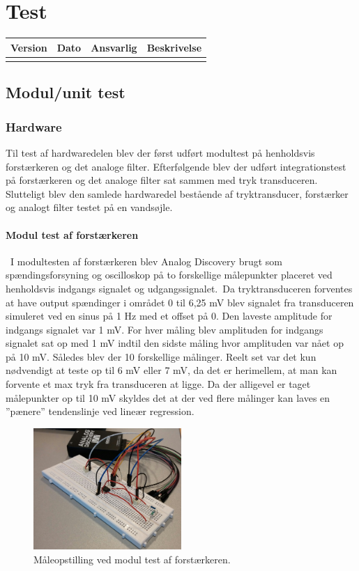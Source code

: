 \chapter{Test}\label{Test}
\setcounter{secnumdepth}{5}

\begin{longtabu} to 
    Version &    Dato &    Ansvarlig &    Beskrivelse\\[-1ex]
    \midrule
\label{version_Systemark}
\end{longtabu}

\section{Modul/unit test}
\subsection{Hardware}
Til test af hardwaredelen blev der først udført modultest på henholdsvis forstærkeren og det analoge filter. Efterfølgende blev der udført integrationstest på forstærkeren og det analoge filter sat sammen med tryk transduceren. Slutteligt blev den samlede hardwaredel bestående af tryktransducer, forstærker og analogt filter testet på en vandsøjle.\
\subsubsection{Modul test af forstærkeren}\
I modultesten af forstærkeren blev Analog Discovery brugt som spændingsforsyning og oscilloskop på to forskellige målepunkter placeret ved henholdsvis indgangs signalet og udgangssignalet.\
Da tryktransduceren forventes at have output spændinger i området 0 til 6,25 mV blev signalet fra transduceren simuleret ved en sinus på 1 Hz med et offset på 0. Den laveste amplitude for indgangs signalet var 1 mV. For hver måling blev amplituden for indgangs signalet sat op med 1 mV indtil den sidste måling hvor amplituden var nået op på 10 mV. Således blev der 10 forskellige målinger. Reelt set var det kun nødvendigt at teste op til 6 mV eller 7 mV, da det er herimellem, at man kan forvente et max tryk fra transduceren at ligge. Da der alligevel er taget målepunkter op til 10 mV skyldes det at der ved flere målinger kan laves en ”pænere” tendenslinje ved lineær regression.\
\begin{figure}[H]
	\centering
	\includegraphics[width=0.5\textwidth]{Figurer/Hardware/ForstaerkerTest}
	\caption{Måleopstilling ved modul test af forstærkeren.}
	\label{fig:ForstaerkerTest}
\end{figure}

